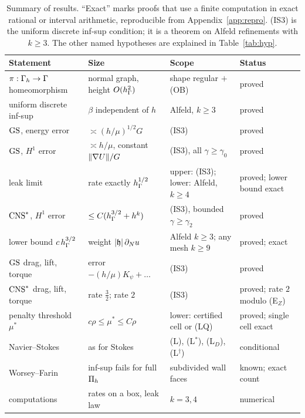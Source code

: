 \begin{table}[t]
\centering\footnotesize
\caption{Summary of results. ``Exact'' marks proofs that use a finite computation in exact rational or interval arithmetic, reproducible from Appendix~\ref{app:repro}. (IS3) is the uniform discrete inf-sup condition; it is a theorem on Alfeld refinements with $k\ge3$. The other named hypotheses are explained in Table~\ref{tab:hyp}.}\label{tab:summary}
\begin{tabular}{>{\raggedright\arraybackslash}p{}>{\raggedright\arraybackslash}p{}>{\raggedright\arraybackslash}p{}>{\raggedright\arraybackslash}p{}}
\toprule
Statement & Size & Scope & Status\\
\midrule
$\pi:\Gamma_h\to\Gamma$ homeomorphism & normal graph, height $O(h_\Gamma^2)$ & shape regular $+$ (OB) & proved\\
uniform discrete inf-sup & $\beta$ independent of $h$ & Alfeld, $k\ge3$ & proved\\
$\mathrm{GS}$, energy error & $\asymp(h/\mu)^{1/2}G$ & (IS3) & proved\\
$\mathrm{GS}$, $H^1$ error & $\asymp h/\mu$, constant $\lVert \nabla U\rVert/G$ & (IS3), all $\gamma\ge\gamma_0$ & proved\\
leak limit & rate exactly $h_\Gamma^{1/2}$ & upper: (IS3); lower: Alfeld, $k\ge4$ & proved; lower bound exact\\
$\mathrm{CNS}^\ast$, $H^1$ error & $\le C(h_\Gamma^{3/2}+h^k)$ & (IS3), bounded $\gamma\ge\gamma_2$ & proved\\
lower bound $c\,h_\Gamma^{3/2}$ & weight $|\mathfrak h|\,\partial_Nu$ & Alfeld $k\ge3$; any mesh $k\ge9$ & proved; exact\\
$\mathrm{GS}$ drag, lift, torque & error $-(h/\mu)K_\psi+\dots$ & (IS3) & proved\\
$\mathrm{CNS}^\ast$ drag, lift, torque & rate $\frac32$; rate $2$ & (IS3) & proved; rate $2$ modulo (E$_Z$)\\
penalty threshold $\mu^\ast$ & $c\rho\le\mu^\ast\le C\rho$ & lower: certified cell or (LQ) & proved; single cell exact\\
Navier--Stokes & as for Stokes & (L), (L$^\ast$), (L$_D$), (L$^\dagger$) & conditional\\
Worsey--Farin & inf-sup fails for full $\Pi_h$ & subdivided wall faces & known; exact count\\
computations & rates on a box, leak law & $k=3,4$ & numerical\\
\bottomrule
\end{tabular}
\end{table}

